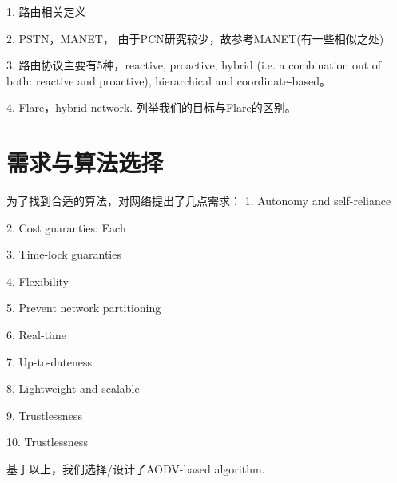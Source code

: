 \documentclass[12pt,a4paper]{article}
\begin{document}
1. 路由相关定义

2. PSTN，MANET，
由于PCN研究较少，故参考MANET(有一些相似之处)

3. 路由协议主要有5种，reactive, proactive, hybrid (i.e. a combination out of both: reactive and proactive), hierarchical and coordinate-based。

4. Flare，hybrid network. 列举我们的目标与Flare的区别。

\section{需求与算法选择}
为了找到合适的算法，对网络提出了几点需求：
1. Autonomy and self-reliance

2. Cost guaranties: Each

3. Time-lock guaranties

4. Flexibility

5. Prevent network partitioning

6. Real-time

7. Up-to-dateness

8. Lightweight and scalable

9. Trustlessness

10. Trustlessness

基于以上，我们选择/设计了AODV-based algorithm.

\clearpage



\end{document}
